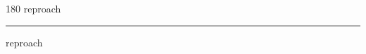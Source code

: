 
\begin{frame}
\begin{center}
\begin{turn}{180}
{\fontsize{2.5cm}{1em}\selectfont reproach}
\end{turn}
\vspace{1em}\par  
\hrule
\vspace{1em}\par  
{\fontsize{2.5cm}{1em}\selectfont reproach}
\end{center}
\end{frame}
